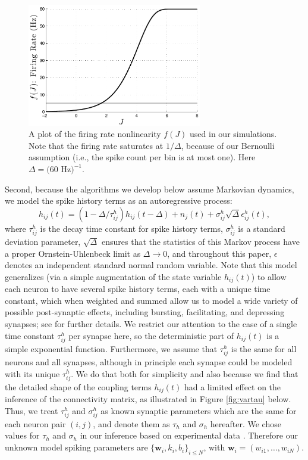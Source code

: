 \documentclass[aoas,preprint]{imsart}
\newcommand{\w}{w}
\newcommand{\bw}{\mathbf{\w}}
\begin{document}
\begin{figure}[t!]
\centering \includegraphics[width=3in]{../figs/fr_vs_J}
\caption{A plot of the firing rate nonlinearity $f(J)$ used in our
  simulations.  Note that the firing
  rate saturates at $1/\Delta$, because of our Bernoulli assumption
  (i.e., the spike count per bin is at most one). Here $\Delta = (60$
  Hz$)^{-1}$.}
\label{fig:egfluor}
\end{figure}

Second, because the algorithms we develop below assume Markovian dynamics, we model the spike history terms as an autoregressive process:
\begin{equation} \label{eqn:h:definition}
h_{ij}(t) = (1- \Delta/\tau^h_{ij}) h_{ij}(t- \Delta) +n_j(t) + \sigma^h_{ij}
  \sqrt{\Delta} \epsilon^h_{ij}(t),
\end{equation}
where $\tau^h_{ij}$ is the decay time constant for spike history terms, $\sigma^h_{ij}$ is a standard deviation parameter, $\sqrt{\Delta}$ ensures that the statistics of this Markov process have a proper Ornstein-Uhlenbeck limit as $\Delta \to 0$, and throughout this paper, $\epsilon$ denotes an independent standard normal random variable. Note that this model generalizes (via a simple augmentation of the state variable $h_{ij}(t)$) to allow each neuron to have several spike history terms, each with a unique time constant, which when weighted and summed allow us to model a wide variety of possible post-synaptic effects, including bursting, facilitating, and depressing synapses; see \cite{Vogelstein2009} for further details. We restrict our attention to the case of a single time constant $\tau^h_{ij}$ per synapse here, so the deterministic part of $h_{ij}(t)$ is a simple exponential function. Furthermore, we assume that $\tau^h_{ij}$ is the same for all neurons and all synapses, although in principle each synapse could be modeled with its unique $\tau^h_{ij}$. We do that both for simplicity and also because we find that the detailed shape of the coupling terms $h_{ij}(t)$ had a limited effect on the inference of the connectivity matrix, as illustrated in Figure \ref{fig:vartau} below. Thus, we treat $\tau^h_{ij}$ and $\sigma^h_{ij}$ as known synaptic parameters which are the same for each neuron pair $(i,j)$, and denote them as $\tau_h$ and $\sigma_h$ hereafter.  We chose values for $\tau_h$ and $\sigma_h$ in our inference based on experimental data \cite{Lefort2009}. Therefore our unknown model spiking parameters are $\{\bw_i,k_i,b_i\}_{i\leq N}$, with $\bw_i=(\w_{i1},\ldots, \w_{iN})$.
\end{document}
